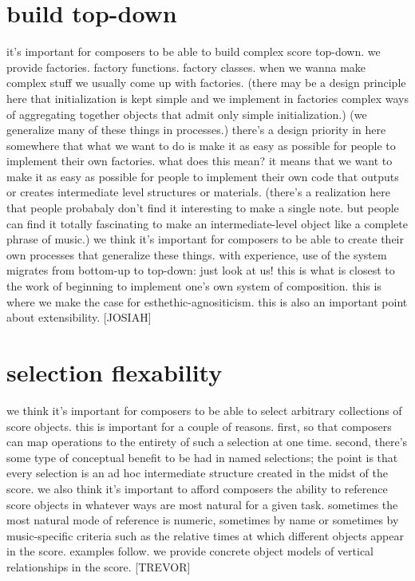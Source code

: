 \documentclass{article}
\begin{document}
\section{build top-down}
it's important for composers to be able to build complex
score top-down. we provide factories. factory functions. factory classes. when
we wanna make complex stuff we usually come up with factories. (there may be a
design principle here that initialization is kept simple and we implement in
factories complex ways of aggregating together objects that admit only simple
initialization.) (we generalize many of these things in processes.) there's a
design priority in here somewhere that what we want to do is make it as easy as
possible for people to implement their own factories. what does this mean? it
means that we want to make it as easy as possible for people to implement their
own code that outputs or creates intermediate level structures or materials.
(there's a realization here that people probabaly don't find it interesting to
make a single note. but people can find it totally fascinating to make an
intermediate-level object like a complete phrase of music.) we think it's
important for composers to be able to create their own processes that
generalize these things. with experience, use of the system migrates from
bottom-up to top-down: just look at us! this is what is closest to the work of
beginning to implement one's own system of composition. this is where we make
the case for esthethic-agnositicism. this is also an important point about
extensibility. [JOSIAH]

\section{selection flexability}
we think it's important for composers to be able to
select arbitrary collections of score objects. this is important for a couple
of reasons. first, so that composers can map operations to the entirety of such
a selection at one time. second, there's some type of conceptual benefit to be
had in named selections; the point is that every selection is an ad hoc
intermediate structure created in the midst of the score. we also think it's
important to afford composers the ability to reference score objects in
whatever ways are most natural for a given task. sometimes the most natural
mode of reference is numeric, sometimes by name or sometimes by music-specific
criteria such as the relative times at which different objects appear in the
score. examples follow. we provide concrete object models of vertical
relationships in the score. [TREVOR]
\end{document}
